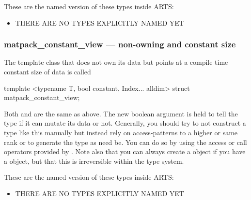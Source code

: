 These are the named version of these types inside ARTS:
\begin{itemize}
\item THERE ARE NO TYPES EXPLICITLY NAMED YET
\end{itemize}

\subsubsection{matpack\_constant\_view --- non-owning and constant size}
The template class that does not own its data but points at a compile time constant size of data
is called
\begin{code}
template <typename T, bool constant, Index... alldim>
struct matpack_constant_view;
\end{code}
Both  and  are the same as above.  The new boolean argument 
is held to tell the type if it can mutate its data or not.  Generally, you should try to not construct
a type like this manually but instead rely on access-patterns to a higher or same rank  or 
to generate the type as need be.  You can do so by using the access or call operators provided by 
.  Note also that you can always create a 
object if you have a  object, but that this is irreversible within the type
system.

These are the named version of these types inside ARTS:
\begin{itemize}
\item THERE ARE NO TYPES EXPLICITLY NAMED YET
\end{itemize}

